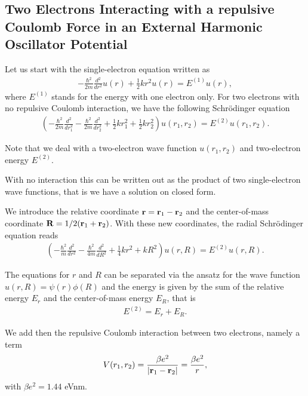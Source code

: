 \documentclass[11pt, a4paper]{article}
\begin{document}
\subsection{Two Electrons Interacting with a repulsive Coulomb Force in an External Harmonic Oscillator Potential} 
Let us start with the single-electron equation written as
\begin{gather}
  -\frac{\hbar^2}{2 m} \frac{d^2}{dr^2} u(r) 
       + \frac{1}{2}k r^2u(r)  = E^{(1)} u(r),
\end{gather}
where $E^{(1)}$ stands for the energy with one electron only.
For two electrons with no repulsive Coulomb interaction, we have the following 
Schr\"odinger equation
\begin{gather}
\left(  -\frac{\hbar^2}{2 m} \frac{d^2}{dr_1^2} -\frac{\hbar^2}{2 m} \frac{d^2}{dr_2^2}+ \frac{1}{2}k r_1^2+ \frac{1}{2}k r_2^2\right)u(r_1,r_2)  = E^{(2)} u(r_1,r_2) .
\end{gather}


Note that we deal with a two-electron wave function $u(r_1,r_2)$ and 
two-electron energy $E^{(2)}$.

With no interaction this can be written out as the product of two
single-electron wave functions, that is we have a solution on closed form.

We introduce the relative coordinate ${\bf r} = {\bf r}_1-{\bf r}_2$
and the center-of-mass coordinate ${\bf R} = 1/2({\bf r}_1+{\bf r}_2)$.
With these new coordinates, the radial Schr\"odinger equation reads
\begin{gather}
\left(  -\frac{\hbar^2}{m} \frac{d^2}{dr^2} -\frac{\hbar^2}{4 m} \frac{d^2}{dR^2}+ \frac{1}{4} k r^2+  kR^2\right)u(r,R)  = E^{(2)} u(r,R).
\end{gather}

The equations for $r$ and $R$ can be separated via the ansatz for the 
wave function $u(r,R) = \psi(r)\phi(R)$ and the energy is given by the sum
of the relative energy $E_r$ and the center-of-mass energy $E_R$, that
is
\begin{gather}
E^{(2)}=E_r+E_R.
\end{gather}

We add then the repulsive Coulomb interaction between two electrons,
namely a term 
\begin{gather}
V(r_1,r_2) = \frac{\beta e^2}{|{\bf r}_1-{\bf r}_2|}=\frac{\beta e^2}{r},
\end{gather}
with $\beta e^2=1.44$ eVnm.
\end{document}
